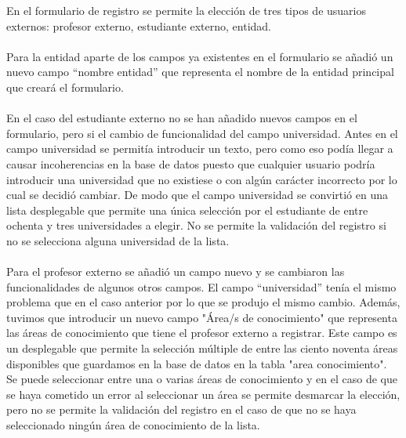 \documentclass[11pt]{article}
\begin{document}
En el formulario de registro se permite la elección de tres tipos de usuarios externos: profesor externo, estudiante externo, entidad.\\\\
Para la entidad aparte de los campos ya existentes en el formulario se añadió un nuevo campo “nombre entidad” que representa el nombre de la entidad principal que creará el formulario.\\\\
En el caso del estudiante externo no se han añadido nuevos campos en el formulario, pero si el cambio de funcionalidad del campo universidad. Antes en el campo universidad se permitía introducir un texto, pero como eso podía llegar a causar incoherencias en la base de datos puesto que cualquier usuario podría introducir una universidad que no existiese o con algún carácter incorrecto por lo cual se decidió cambiar. De modo que el campo universidad se convirtió en una lista desplegable que permite una única selección por el estudiante de entre ochenta y tres universidades a elegir.  No se permite la validación del registro si no se selecciona alguna universidad de la lista. \\\\
Para el profesor externo se añadió un campo nuevo y se cambiaron las funcionalidades de algunos otros campos. El campo “universidad” tenía el mismo problema que en el caso anterior por lo que se produjo el mismo cambio. Además, tuvimos que introducir un nuevo campo "Área/s de conocimiento" que representa las áreas de conocimiento que tiene el profesor externo a registrar. Este campo es un desplegable que permite la selección múltiple de entre las ciento noventa áreas disponibles que guardamos en la base de datos en la tabla "area conocimiento". Se puede seleccionar entre una o varias áreas de conocimiento y en el caso de que se haya cometido un error al seleccionar un área se permite desmarcar la elección, pero no se permite la validación del registro en el caso de que no se haya seleccionado ningún área de conocimiento de la lista.\\\\
\end{document}
